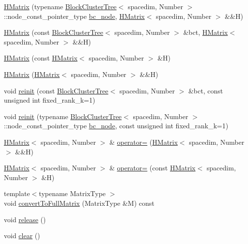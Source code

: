 \begin{DoxyCompactItemize}
\hyperlink{classHMatrix_abeb8d0add9bffecafc12f4c6b1dcab8e}{H\+Matrix} (typename \hyperlink{classBlockClusterTree}{Block\+Cluster\+Tree}$<$ spacedim, Number $>$\+::node\+\_\+const\+\_\+pointer\+\_\+type \hyperlink{classHMatrix_a4a304494c970b5b267be1d8459d51586}{bc\+\_\+node}, \hyperlink{classHMatrix}{H\+Matrix}$<$ spacedim, Number $>$ \&\&H)
\item 
\hyperlink{classHMatrix_a78aa967d7a99e27cc172f0db3791306b}{H\+Matrix} (const \hyperlink{classBlockClusterTree}{Block\+Cluster\+Tree}$<$ spacedim, Number $>$ \&bct, \hyperlink{classHMatrix}{H\+Matrix}$<$ spacedim, Number $>$ \&\&H)
\item 
\hyperlink{classHMatrix_a0b5227e35290f6c9fba1e8948e9a29c3}{H\+Matrix} (const \hyperlink{classHMatrix}{H\+Matrix}$<$ spacedim, Number $>$ \&H)
\item 
\hyperlink{classHMatrix_a556325d4cdaee699f17aa1be63bb58ee}{H\+Matrix} (\hyperlink{classHMatrix}{H\+Matrix}$<$ spacedim, Number $>$ \&\&H)
\item 
void \hyperlink{classHMatrix_a83f804163e1695cfb952ddb6b0df2503}{reinit} (const \hyperlink{classBlockClusterTree}{Block\+Cluster\+Tree}$<$ spacedim, Number $>$ \&bct, const unsigned int fixed\+\_\+rank\+\_\+k=1)
\item 
void \hyperlink{classHMatrix_a41d20c1839f3d7a756107b8e4defea0b}{reinit} (typename \hyperlink{classBlockClusterTree}{Block\+Cluster\+Tree}$<$ spacedim, Number $>$\+::node\+\_\+const\+\_\+pointer\+\_\+type \hyperlink{classHMatrix_a4a304494c970b5b267be1d8459d51586}{bc\+\_\+node}, const unsigned int fixed\+\_\+rank\+\_\+k=1)
\item 
\hyperlink{classHMatrix}{H\+Matrix}$<$ spacedim, Number $>$ \& \hyperlink{classHMatrix_a2c72ede65323af5b57a6b16f5774de50}{operator=} (\hyperlink{classHMatrix}{H\+Matrix}$<$ spacedim, Number $>$ \&\&H)
\item 
\hyperlink{classHMatrix}{H\+Matrix}$<$ spacedim, Number $>$ \& \hyperlink{classHMatrix_a83958971f40409b3b2a192b71eae1513}{operator=} (const \hyperlink{classHMatrix}{H\+Matrix}$<$ spacedim, Number $>$ \&H)
\item 
{\footnotesize template$<$typename Matrix\+Type $>$ }\\void \hyperlink{classHMatrix_a00bdd40f7fcf5c912c34c427df518300}{convert\+To\+Full\+Matrix} (Matrix\+Type \&M) const
\item 
void \hyperlink{classHMatrix_a812e8276888b2ad866edf7ce9b286839}{release} ()
\item 
void \hyperlink{classHMatrix_ae55bd45587b895bfdb977e7cbea46519}{clear} ()

\end{DoxyCompactItemize}
